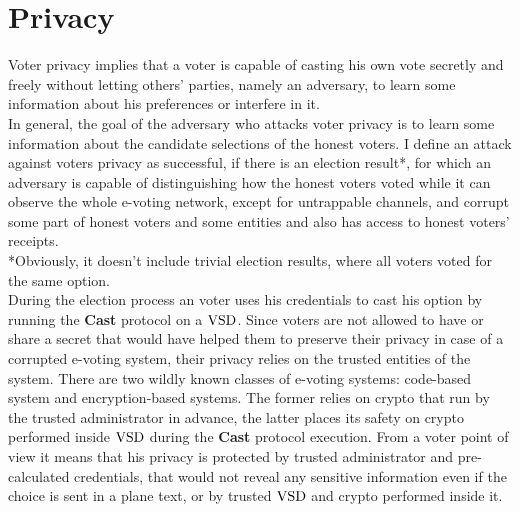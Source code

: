 \chapter{Privacy}

Voter privacy implies that a voter is capable of casting his own vote secretly and freely without letting others' parties, namely an adversary, to learn some information about his preferences or interfere in it.\\

In general, the goal of the adversary who attacks voter privacy is to learn some information about the candidate selections of the honest voters. I define an attack against voters privacy as successful, if there is an election result*, for which an adversary is capable of distinguishing how the honest voters voted while it can observe the whole e-voting network, except for untrappable channels, and corrupt some part of honest voters and some entities and also has access to honest voters' receipts. \\

*Obviously, it doesn't include trivial election results, where all voters voted for the same option. \\

During the election process an voter uses his credentials to cast his option by running the \textbf{Cast} protocol on a $\operatorname{VSD}$. Since voters are not allowed to have or share a secret that would have helped them to preserve their privacy in case of a corrupted e-voting system, their privacy relies on the trusted entities of the system. There are two wildly known classes of e-voting systems: code-based system and encryption-based systems. The former relies on crypto that run by the trusted administrator in advance, the latter places its safety on crypto performed inside $\operatorname{VSD}$ during the \textbf{Cast} protocol execution. From a voter point of view it means that his privacy is protected by trusted administrator and pre-calculated credentials, that would not reveal any sensitive information even if the choice is sent in a plane text, or by trusted $\operatorname{VSD}$ and crypto performed inside it. \\

